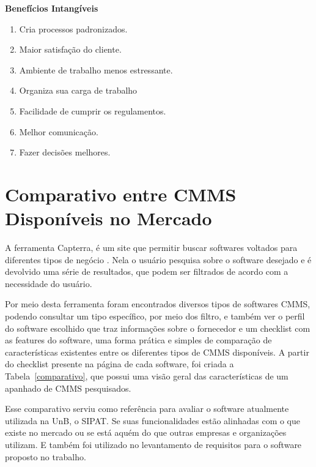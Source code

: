 \textbf{Benefícios Intangíveis}

\begin{enumerate}
	\item Cria processos padronizados.
	\item Maior satisfação do cliente.
	\item Ambiente de trabalho menos estressante.
	\item Organiza sua carga de trabalho
	\item Facilidade de cumprir os regulamentos.
	\item Melhor comunicação.
	\item Fazer decisões melhores.
\end{enumerate}






\section{Comparativo entre CMMS Disponíveis no Mercado}

A ferramenta Capterra, é um site que permitir buscar softwares voltados para diferentes tipos de negócio \cite{capterra}. Nela o usuário pesquisa sobre o software desejado e é devolvido uma série de resultados, que podem ser filtrados de acordo com a necessidade do usuário.

Por meio desta ferramenta foram encontrados diversos tipos de softwares CMMS, podendo consultar um tipo específico, por meio dos filtro, e também ver o perfil do software escolhido que traz informações sobre o fornecedor e um checklist com as features do software, uma forma prática e simples de comparação de características existentes entre os diferentes tipos de CMMS disponíveis. A partir do checklist presente na página de cada software, foi criada a Tabela~\ref{comparativo}, que possui uma visão geral das características de um apanhado de CMMS pesquisados.

Esse comparativo serviu como referência para avaliar o software atualmente utilizada na UnB, o SIPAT. Se suas funcionalidades estão alinhadas com o que existe no mercado ou se está aquém do que outras empresas e organizações utilizam. E também foi utilizado no levantamento de requisitos para o software proposto no trabalho.

